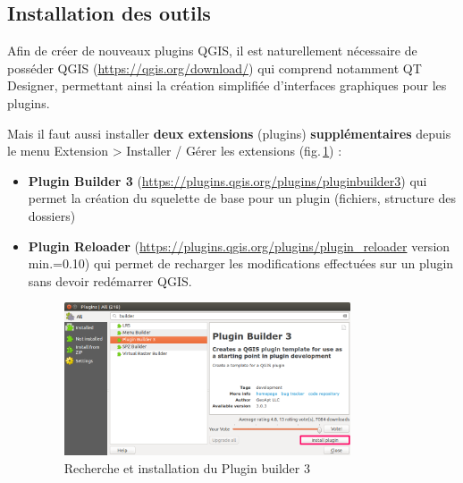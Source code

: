 \documentclass[11pt]{article}
\begin{document}
\subsection{Installation des outils}
\label{InstallationDesOutils}

Afin de créer de nouveaux plugins QGIS, il est naturellement nécessaire de posséder QGIS (\url{https://qgis.org/download/}) qui comprend notamment QT Designer, permettant ainsi la création simplifiée d'interfaces graphiques pour les plugins. \vspace*{0.2em}

Mais il faut aussi installer \textbf{deux extensions} (plugins) \textbf{supplémentaires} depuis le menu \og{}Extension\fg{} >{} \og{}Installer / Gérer les extensions\fg{} (fig.\,\ref{extensions}) : \vspace*{0.2em}

\begin{itemize}\itemsep0.2em
\renewcommand\labelitemi{\---}
\item \og{}\textbf{Plugin Builder 3}\fg{} (\url{https://plugins.qgis.org/plugins/pluginbuilder3}) qui permet la création du squelette de base pour un plugin (fichiers, structure des dossiers)
\item \og{}\textbf{Plugin Reloader}\fg{} (\url{https://plugins.qgis.org/plugins/plugin_reloader} version min.=0.10) qui permet de recharger les modifications effectuées sur un plugin sans devoir redémarrer QGIS.


\vspace*{-0.2em}
\begin{figure}[H]
	\centering
    \includegraphics[width=0.8\textwidth]{plugin_builder_install.png}
    \vspace*{-0.4em}
	\caption{Recherche et installation du \og{}Plugin builder 3\fg{}}
    \label{extensions}
\end{figure}

\end{itemize} 
\vspace{1em}
\end{document}
